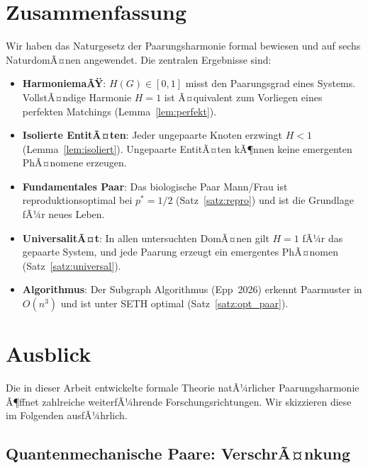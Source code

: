 ﻿\documentclass[a4paper,12pt]{article}
\theoremstyle{definition}
\begin{document}
\section{Zusammenfassung}

Wir haben das Naturgesetz der Paarungsharmonie formal bewiesen und auf sechs
NaturdomÃ¤nen angewendet. Die zentralen Ergebnisse sind:

\begin{itemize}
	\item \textbf{HarmoniemaÃŸ}: $H(G) \in [0,1]$ misst den Paarungsgrad eines Systems.
	VollstÃ¤ndige Harmonie $H = 1$ ist Ã¤quivalent zum Vorliegen eines perfekten Matchings
	(Lemma~\ref{lem:perfekt}).
	
	\item \textbf{Isolierte EntitÃ¤ten}: Jeder ungepaarte Knoten erzwingt $H < 1$
	(Lemma~\ref{lem:isoliert}). Ungepaarte EntitÃ¤ten kÃ¶nnen keine emergenten
	PhÃ¤nomene erzeugen.
	
	\item \textbf{Fundamentales Paar}: Das biologische Paar Mann/Frau ist
	reproduktionsoptimal bei $p^* = 1/2$ (Satz~\ref{satz:repro}) und ist die
	Grundlage fÃ¼r neues Leben.
	
	\item \textbf{UniversalitÃ¤t}: In allen untersuchten DomÃ¤nen gilt $H = 1$ fÃ¼r
	das gepaarte System, und jede Paarung erzeugt ein emergentes PhÃ¤nomen
	(Satz~\ref{satz:universal}).
	
	\item \textbf{Algorithmus}: Der Subgraph Algorithmus (Epp~2026) erkennt
	Paarmuster in $O(n^3)$ und ist unter SETH optimal (Satz~\ref{satz:opt_paar}).
\end{itemize}

\section{Ausblick}
\label{sec:ausblick}

Die in dieser Arbeit entwickelte formale Theorie natÃ¼rlicher Paarungsharmonie
Ã¶ffnet zahlreiche weiterfÃ¼hrende Forschungsrichtungen. Wir skizzieren diese im
Folgenden ausfÃ¼hrlich.

\subsection{Quantenmechanische Paare: VerschrÃ¤nkung}
\end{document}
